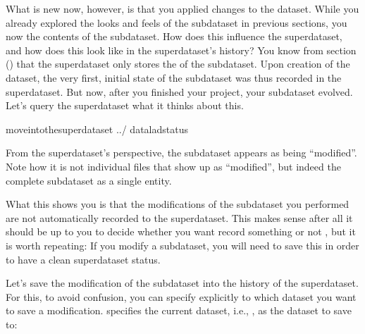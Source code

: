 \sphinxAtStartPar
What is new now, however, is that you applied changes to the dataset. While
you already explored the looks and feels of the  subdataset in
previous sections, you now  the contents of the 
subdataset.
How does this influence the superdataset, and how does this look like in the
superdataset’s history? You know from section {\hyperref[\detokenize{basics/101-106-nesting:nesting}]{}} () that the
superdataset only stores the  of the subdataset. Upon creation of the
dataset, the very first, initial state of the subdataset was thus recorded in
the superdataset. But now, after you finished your project, your subdataset
evolved. Let’s query the superdataset what it thinks about this.

\begin{sphinxVerbatim}[commandchars=\\\{\}]
moveintothesuperdataset
../
dataladstatus
\end{sphinxVerbatim}

\sphinxAtStartPar
From the superdataset’s perspective, the subdataset appears as being
“modified”. Note how it is not individual files that show up as “modified”, but
indeed the complete subdataset as a single entity.

\sphinxAtStartPar
What this shows you is that the modifications of the subdataset you performed are not
automatically recorded to the superdataset. This makes sense \textendash{} after all it
should be up to you to decide whether you want record something or not \textendash{},
but it is worth repeating: If you modify a subdataset, you will need to save
this  in order to have a clean superdataset status.

\sphinxAtStartPar
Let’s save the modification of the subdataset into the history of the
superdataset. For this, to avoid confusion, you can specify explicitly to
which dataset you want to save a modification.  specifies the current
dataset, i.e., , as the dataset to save to:

